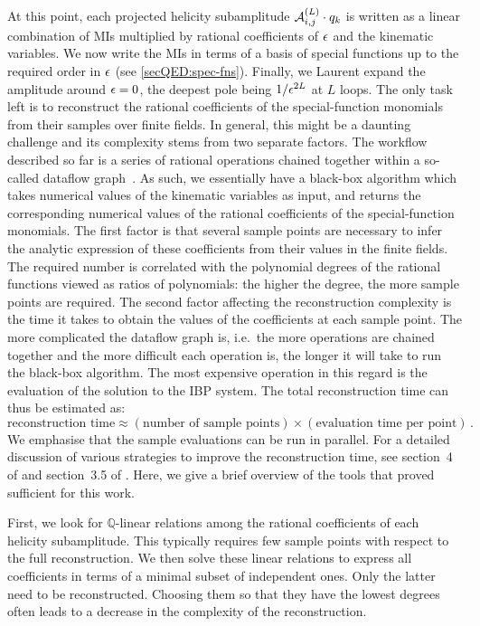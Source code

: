 \documentclass[main.tex]{subfiles}
\begin{document}
At this point, each projected helicity subamplitude $\mathcal{A}^{(L)}_{i,j}\cdot q_k$
is written as a linear combination of \acp{MI} multiplied by rational
coefficients of $\epsilon$ and the kinematic variables. We now write the \acp{MI}
in terms of a basis of special functions up to the required order in $\epsilon$
(see \cref{secQED:spec-fns}). Finally, we Laurent expand the amplitude around
$\epsilon=0$, the deepest pole being $1/\epsilon^{2 L}$ at $L$ loops. The only task
left is to reconstruct the rational coefficients of the special-function
monomials from their samples over finite fields. In general, this might be a
daunting challenge and its complexity stems from two separate factors. The
workflow described so far is a series of rational operations chained together
within a so-called dataflow graph~\cite{Peraro:2019svx}. As such, we
essentially have a black-box algorithm which takes numerical values of the
kinematic variables as input, and returns the corresponding numerical values of
the rational coefficients of the special-function monomials. The first factor
is that several sample points are necessary to infer the analytic expression of
these coefficients from their values in the finite fields. The required number
is correlated with the polynomial degrees of the rational functions viewed as
ratios of polynomials: the higher the degree, the more sample points are
required. The second factor affecting the reconstruction complexity is the time
it takes to obtain the values of the coefficients at each sample point. The
more complicated the dataflow graph is, i.e.~the more operations are chained
together and the more difficult each operation is, the longer it will take to
run the black-box algorithm. The most expensive operation in this regard is the
evaluation of the solution to the \ac{IBP} system.  The total reconstruction
time can thus be estimated as:
\begin{equation} \label{eqQED:rectimeschematic}
	\text{reconstruction time} \approx (\text{number of sample points}) \times (\text{evaluation time per point})\,.
\end{equation}
We emphasise that the sample evaluations can be run in parallel.  For a
detailed discussion of various strategies to improve the reconstruction time,
see section~4 of  and section~3.5 of
. Here, we give a brief overview of the tools that
proved sufficient for this work.

First, we look for $\mathbb{Q}$-linear relations among the rational
coefficients of each helicity subamplitude. This typically requires few sample
points with respect to the full reconstruction. We then solve these linear
relations to express all coefficients in terms of a minimal subset of
independent ones. Only the latter need to be reconstructed. Choosing them so
that they have the lowest degrees often leads to a decrease in the complexity
of the reconstruction.
\end{document}
